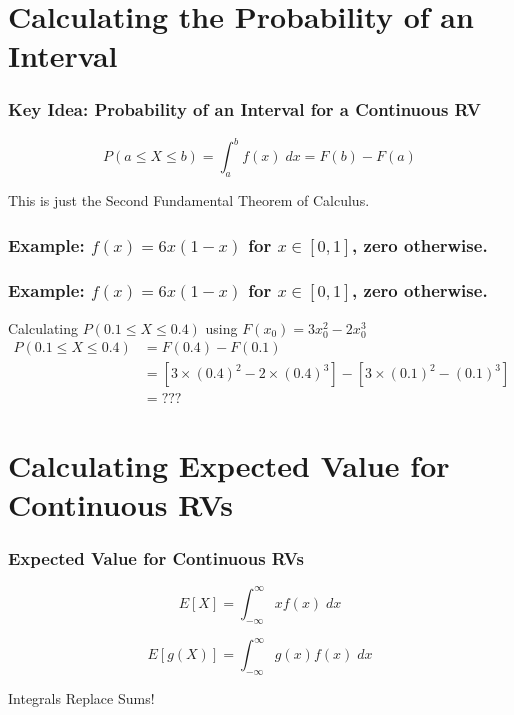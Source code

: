 \section{Calculating the Probability of an Interval}
\begin{frame}
\frametitle{Key Idea: Probability of an Interval for a Continuous RV}

$$\boxed{P(a\leq X \leq b) = \int_a^b f(x) \; dx = F(b) - F(a)}$$

\vspace{2em}
\alert{This is just the Second Fundamental Theorem of Calculus.}
\end{frame}
\begin{frame}
  \frametitle{Example: $f(x) = 6x(1-x)$ for $x \in [0,1]$, zero otherwise.}

\end{frame}
\begin{frame}
  \frametitle{Example: $f(x) = 6x(1-x)$ for $x \in [0,1]$, zero otherwise.}

  \begin{block}{Calculating $P(0.1\leq X \leq 0.4)$ using $F(x_0) = 3x_0^2 - 2x_0^3$}
    \begin{align*}
      P(0.1 \leq X \leq 0.4) &= F(0.4) - F(0.1) \\
      &= \left[ 3\times (0.4)^2 - 2 \times (0.4)^3 \right] - \left[ 3 \times (0.1)^2 - (0.1)^3 \right]\\
      &= ???
    \end{align*}
  \end{block}

\end{frame}
\section{Calculating Expected Value for Continuous RVs}

\begin{frame}
\frametitle{Expected Value for Continuous RVs}
\[\boxed{E[X] = \int_{-\infty}^\infty x f(x) \; dx}\]

\[\boxed{E[g(X)] = \int_{-\infty}^\infty g(x) f(x) \; dx}\]

\vspace{2em}
\hfill\alert{Integrals Replace Sums!}
\end{frame}

